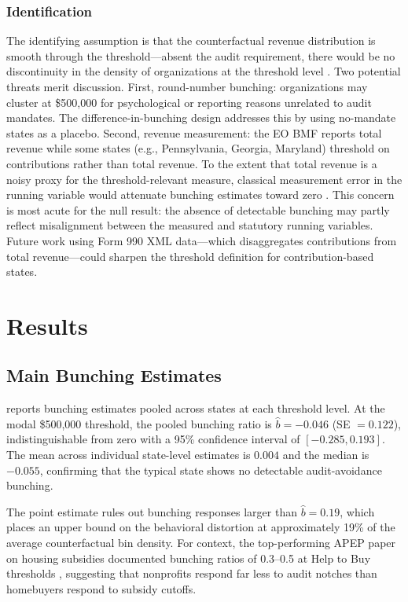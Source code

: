 \documentclass[12pt]{article}
\begin{document}
\subsubsection*{Identification} The identifying assumption is that the counterfactual revenue distribution is smooth through the threshold---absent the audit requirement, there would be no discontinuity in the density of organizations at the threshold level \citep{Kleven2013}. Two potential threats merit discussion. First, round-number bunching: organizations may cluster at \$500,000 for psychological or reporting reasons unrelated to audit mandates. The difference-in-bunching design addresses this by using no-mandate states as a placebo. Second, revenue measurement: the EO BMF reports total revenue while some states (e.g., Pennsylvania, Georgia, Maryland) threshold on contributions rather than total revenue. To the extent that total revenue is a noisy proxy for the threshold-relevant measure, classical measurement error in the running variable would attenuate bunching estimates toward zero \citep{Kleven2016}. This concern is most acute for the null result: the absence of detectable bunching may partly reflect misalignment between the measured and statutory running variables. Future work using Form 990 XML data---which disaggregates contributions from total revenue---could sharpen the threshold definition for contribution-based states.

\section{Results}

\subsection{Main Bunching Estimates}



 reports bunching estimates pooled across states at each threshold level. At the modal \$500,000 threshold, the pooled bunching ratio is $\hat{b} = -0.046$ (SE $= 0.122$), indistinguishable from zero with a 95\% confidence interval of $[-0.285, 0.193]$. The mean across individual state-level estimates is $0.004$ and the median is $-0.055$, confirming that the typical state shows no detectable audit-avoidance bunching.

The point estimate rules out bunching responses larger than $\hat{b} = 0.19$, which places an upper bound on the behavioral distortion at approximately 19\% of the average counterfactual bin density. For context, the top-performing APEP paper on housing subsidies documented bunching ratios of 0.3--0.5 at Help to Buy thresholds \citep{APEPhtb2026}, suggesting that nonprofits respond far less to audit notches than homebuyers respond to subsidy cutoffs.
\end{document}
